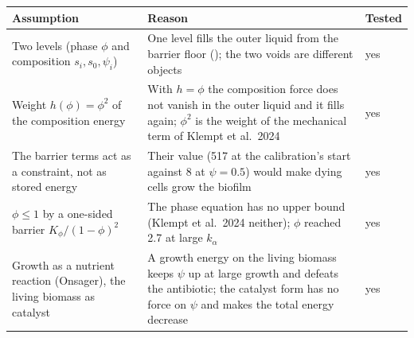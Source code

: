 \documentclass[11pt,a4paper]{article}
\begin{document}
\small\begin{tabularx}{\linewidth}{@{}YYp{2.4cm}@{}}
\toprule
Assumption & Reason & Tested\\
\midrule
Two levels (phase $\phi$ and composition $s_i,s_0,\psi_i$) & One level fills the outer liquid
from the barrier floor (); the two voids are different
objects & yes\\
Weight $h(\phi)=\phi^2$ of the composition energy & With $h=\phi$ the composition force does
not vanish in the outer liquid and it fills again; $\phi^2$ is the weight of the mechanical
term of Klempt et al.\ 2024 & yes\\
The barrier terms act as a constraint, not as stored energy & Their value (517 at the
calibration's start against 8 at $\psi=0.5$) would make dying cells grow the biofilm & yes\\
$\phi\le1$ by a one-sided barrier $K_\phi/(1-\phi)^2$ & The phase equation has no upper
bound (Klempt et al.\ 2024 neither); $\phi$ reached 2.7 at large $k_\alpha$ & yes\\
Growth as a nutrient reaction (Onsager), the living biomass as catalyst & A growth energy on
the living biomass keeps $\psi$ up at large growth and defeats the antibiotic; the catalyst form
has no force on $\psi$ and makes the total energy decrease & yes\\
\bottomrule
\end{tabularx}
\end{document}
